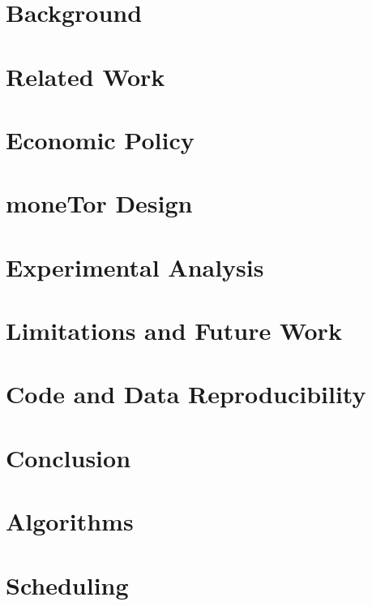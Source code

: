 \documentclass[sigconf, anonymous]{acmart}
\begin{document}
\section{Background}
\label{sec:background}


\section{Related Work}
\label{sec:related_work}


\section{Economic Policy}
\label{sec:tor_incentives}


\section{moneTor Design}
\label{sec:design}


\section{Experimental Analysis}
\label{sec:analysis}


\section{Limitations and Future Work}
\label{sec:limitations_futurework}


\section{Code and Data Reproducibility}
\label{sec:code}

\section{Conclusion}
\label{sec:conclusion}





\appendix

\section{Algorithms}
\label{sec:algorithms}


\section{Scheduling}
\label{sec:scheduling}

\end{document}
